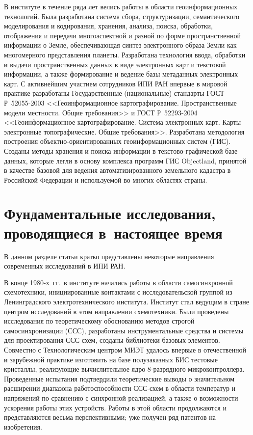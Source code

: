 \begin{multicols}{2}
     В институте в течение ряда лет велись работы в области
геоинформационных технологий. Была разработана система сбора,
структуризации, семантического моделирования и кодирования,
хранения, анализа, поиска, обработки, отображения и передачи
многоаспектной и разной по форме пространственной информации о
Земле, обеспечивающая синтез электронного образа Земли как
многомерного представления планеты. Разработана технология
ввода, обработки и выдачи пространственных данных в виде
электронных карт и текстовой информации, а также формирование и
ведение базы метаданных электронных карт. С активнейшим
участием сотрудников ИПИ РАН впервые в мировой практике
разработаны Государственные (национальные) стандарты ГОСТ
Р~52055-2003 <<Геоинформационное картографирование.
Пространственные модели местности. Общие требования>> и ГОСТ
Р~52293-2004 <<Геоинформационное картографирование. Система
электронных карт. Карты электронные топографические. Общие\linebreak
требования>>. Разработана методология по\-стро\-ения
     объектно-ориентированных геоинформационных систем (ГИС).
Созданы методы хранения и поиска информации в
     текстово-графической базе данных, которые легли в основу
комплекса программ ГИС Objectland, принятой в качестве базовой
для ведения автоматизированного земельного кадастра в Российской
Федерации и используемой во многих областях страны.

\vspace*{-7pt}

\section{Фундаментальные исследования, проводящиеся 
в~настоящее время}
\vspace*{-3pt}

     В данном разделе статьи кратко представлены некоторые
направления современных исследований в ИПИ РАН.

     В конце 1980-х~гг.\ в институте начались работы в области
самосинхронной схемотехники, ини\-ци\-иро\-ван\-ные контактами с
исследовательской группой из Ленинградского электротехнического
института. Институт стал ведущим в стране центром исследований в
этом направлении схемотехники. Были проведены исследования по
теоретическому обоснованию методов строгой самосинхронизации
(ССС), разработаны инструментальные средства и системы для
проектирования ССС-схем, созданы библиотеки базовых элементов.
Совместно с Технологическим центром МИЭТ удалось впервые в
отечественной и зарубежной практике изготовить на базе
полузаказных БИС тестовые кристаллы, реализующие
вычислительное ядро 8-разрядного микроконтроллера. Проведенные
испытания подтвердили теоретические выводы о значительном
расширении диапазона работоспособности ССС-схем в области
температур и напряжений по сравнению с синхронной реализацией,
а также о возможности ускорения работы этих устройств. %
Работы в
этой области продолжаются и пред\-став\-ля\-ют\-ся весьма
перспективными; уже получен ряд патентов на изобретения.
{

}
\end{multicols}
